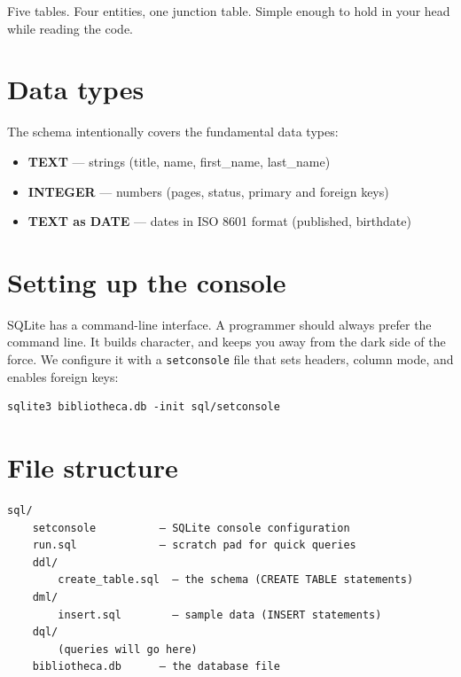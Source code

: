 \documentclass[11pt,a4paper,oneside]{book}
\providecommand{\tightlist}{%
  \setlength{\itemsep}{0pt}\setlength{\parskip}{0pt}}
\begin{document}
Five tables. Four entities, one junction table. Simple enough to
hold in your head while reading the code.

\hypertarget{data-types}{%
\section{Data types}\label{data-types}}

The schema intentionally covers the fundamental data types:

\begin{itemize}
\tightlist
\item
  \textbf{TEXT} --- strings (title, name, first\_name,
  last\_name)
\item
  \textbf{INTEGER} --- numbers (pages, status, primary and
  foreign keys)
\item
  \textbf{TEXT as DATE} --- dates in ISO 8601 format (published,
  birthdate)
\end{itemize}

\hypertarget{setting-up-the-console}{%
\section{Setting up the console}\label{setting-up-the-console}}

SQLite has a command-line interface. A programmer should always
prefer the command line. It builds character, and keeps you away
from the dark side of the force. We configure it with a
\texttt{setconsole} file that sets headers, column mode, and
enables foreign keys:

\begin{verbatim}
sqlite3 bibliotheca.db -init sql/setconsole
\end{verbatim}

\hypertarget{file-structure}{%
\section{File structure}\label{file-structure}}

\begin{verbatim}
sql/
    setconsole          — SQLite console configuration
    run.sql             — scratch pad for quick queries
    ddl/
        create_table.sql  — the schema (CREATE TABLE statements)
    dml/
        insert.sql        — sample data (INSERT statements)
    dql/
        (queries will go here)
    bibliotheca.db      — the database file
\end{verbatim}
\end{document}

